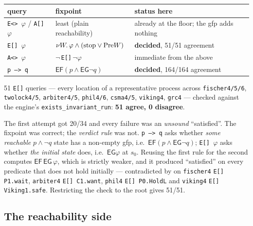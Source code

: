 \begin{center}\small
\begin{tabular}{lll}
\toprule
query & fixpoint & status here \\
\midrule
\texttt{E<> $\varphi$} / \texttt{A[] $\varphi$} & least (plain reachability) & already at the floor; the gfp adds nothing \\
\texttt{E[] $\varphi$} & $\nu W.\,\varphi \wedge (\mathrm{stop} \vee \mathrm{Pre} W)$ & \textbf{decided}, 51/51 agreement \\
\texttt{A<> $\varphi$} & $\lnot\,$\texttt{E[]}$\,\lnot\varphi$ & immediate from the above \\
\texttt{p --> q} & $\mathsf{EF}(p \wedge \mathsf{EG}\lnot q)$ & \textbf{decided}, 164/164 agreement \\
\bottomrule
\end{tabular}
\end{center}
\measured{}

51 \texttt{E[]} queries --- every location of a representative process across
\texttt{fischer4/5/6}, \texttt{twolock4/5}, \texttt{arbiter4/5}, \texttt{phil4/6},
\texttt{csma4/5}, \texttt{viking4}, \texttt{grc4} --- checked against the engine's
\texttt{exists\_invariant\_run}: \textbf{51 agree, 0 disagree}.

\begin{remark}
The first attempt got 20/34 and every failure was an \emph{unsound} ``satisfied''. The fixpoint was
correct; the \emph{verdict rule} was not. \texttt{p --> q} asks whether \emph{some reachable}
$p \wedge \lnot q$ state has a non-empty gfp, i.e.\ $\mathsf{EF}(p \wedge \mathsf{EG}\lnot q)$;
\texttt{E[] $\varphi$} asks whether \emph{the initial state} does, i.e.\ $\mathsf{EG}\varphi$ at
$s_0$. Reusing the first rule for the second computes $\mathsf{EF}\,\mathsf{EG}\,\varphi$, which is
strictly weaker, and it produced ``satisfied'' on every predicate that does not hold initially ---
contradicted by \verifyta{} on \texttt{fischer4} \texttt{E[] P1.wait}, \texttt{arbiter4}
\texttt{E[] C1.want}, \texttt{phil4} \texttt{E[] P0.HoldL} and \texttt{viking4}
\texttt{E[] Viking1.safe}. Restricting the check to the root gives 51/51. \measured{}
\end{remark}

\subsection{The reachability side}

